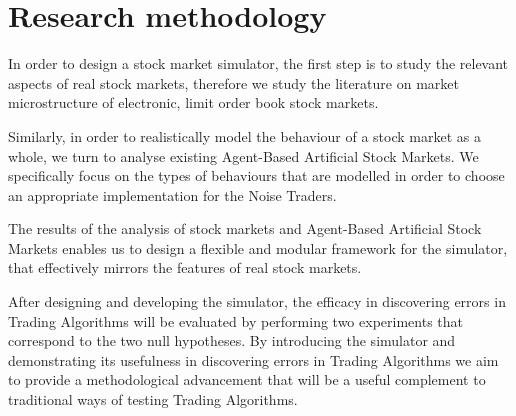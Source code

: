 \section{Research methodology}

In order to design a stock market simulator, the first step is to study the relevant aspects of real stock markets, therefore we study the literature on market microstructure of electronic, limit order book stock markets.

Similarly, in order to realistically model the behaviour of a stock market as a whole, we turn to analyse existing Agent-Based Artificial Stock Markets. We specifically focus on the types of behaviours that are modelled in order to choose an appropriate implementation for the Noise Traders.

The results of the analysis of stock markets and Agent-Based Artificial Stock Markets enables us to design a flexible and modular framework for the simulator, that effectively mirrors the features of real stock markets. 

After designing and developing the simulator, the efficacy in discovering errors in Trading Algorithms will be evaluated by performing two experiments that correspond to the two null hypotheses. By introducing the simulator and demonstrating its usefulness in discovering errors in Trading Algorithms we aim to provide a methodological advancement that will be a useful complement to traditional ways of testing Trading Algorithms.
